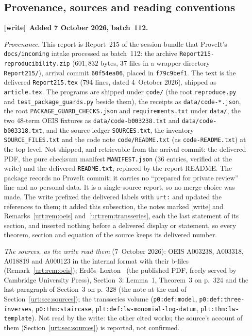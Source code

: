 \documentclass[11pt,letterpaper]{article}
\theoremstyle{remark}\newtheorem{remark}[theorem]{Remark}
\newcommand{\file}[1]{\nolinkurl{#1}}
\newenvironment{writenote}[1][]{\par\smallskip\begingroup\small
 \noindent\textbf{[write]}\if\relax\detokenize{#1}\relax\else~\textbf{#1.}\fi\ }%
 {\par\endgroup\smallskip}
\begin{document}
\subsection{Provenance, sources and reading conventions}\label{urt:sec:provenance}
\begin{writenote}[Added 7 October 2026, batch~112]\raggedright
\emph{Provenance.} This report is Report~215 of the session bundle that
ProveIt's \file{docs/incoming} intake processed as batch~112: the archive
\file{Report215-reproducibility.zip} ($601{,}832$ bytes, 37 files in a
wrapper directory \file{Report215/}), arrival commit \file{60f54ea06},
placed in \file{f79c9bef1}. The text is the delivered \file{Report215.tex}
(794 lines, dated 4~October 2026), shipped as \file{article.tex}. The
programs are shipped under \file{code/} (the root \file{reproduce.py} and
\file{test_package_guards.py} beside them), the receipts as
\file{data/code-*.json}, the root \file{PACKAGE_GUARD_CHECKS.json} and
\file{requirements.txt} under \file{data/}, the two 48-term OEIS fixtures as
\file{data/code-b003238.txt} and \file{data/code-b003318.txt}, and the source
ledger \file{SOURCES.txt}, the inventory \file{SOURCE_FILES.txt} and the code
note \file{code/README.txt} (as \file{code-README.txt}) at the top level. Not
shipped, and retrievable from the arrival commit: the delivered PDF, the pure
checksum manifest \file{MANIFEST.json} (36 entries, verified at the write)
and the delivered \file{README.txt}, replaced by the report README. The
package records no ProveIt commit; it carries no ``prepared for private
review'' line and no personal data. It is a single-source report, so no merge
choice was made. The write prefixed the delivered labels with \file{urt:} and
updated the references to them; it added this subsection, the notes marked
[write] and Remarks~\ref{urt:rem:oeis} and~\ref{urt:rem:transseries}, each the
last statement of its section, and inserted nothing before a delivered
display or statement, so every theorem, section and equation of the source
keeps its delivered number.

\emph{The sources, as the write read them} (7~October 2026): OEIS A003238,
A003318, A018819 and A000123 in the internal format with their b-files
(Remark~\ref{urt:rem:oeis}); Erd\H{o}s--Loxton~\cite{el} (the published
PDF, freely served by Cambridge University Press), Section~3: Lemma~1,
Theorem~3 on p.~324 and the last paragraph of Section~3 on p.~328 (the note
at the end of Section~\ref{urt:sec:sources}); the transseries volume
(\file{p0:def:model}, \file{p0:def:three-inverses}, \file{p0:thm:staircase},
\file{plt:def:lw-monomial-log-datum}, \file{plt:thm:lw-template}). Not read
by the write: the other cited works; the source's account of them
(Section~\ref{urt:sec:sources}) is reported, not confirmed.


\end{writenote}
\end{document}
